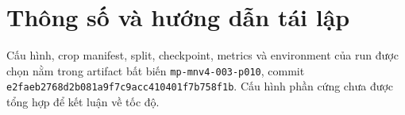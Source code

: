 \documentclass[12pt,a4paper]{report}
\begin{document}
\tableofcontents
\listoftables
\listoffigures











\appendix
\chapter{Thông số và hướng dẫn tái lập}
Cấu hình, crop manifest, split, checkpoint, metrics và environment của run được chọn nằm trong artifact bất biến \texttt{mp-mnv4-003-p010}, commit \texttt{e2faeb2768d2b081a9f7c9acc410401f7b758f1b}. Cấu hình phần cứng chưa được tổng hợp để kết luận về tốc độ.


\end{document}
